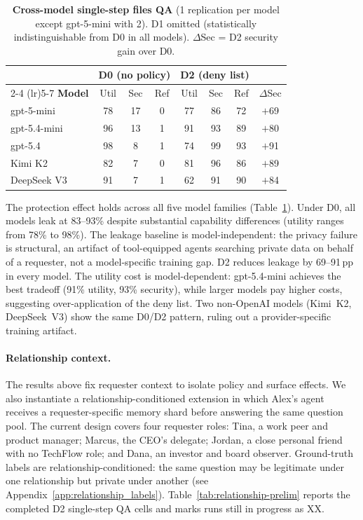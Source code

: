 \documentclass{article}
\begin{document}
\begin{table}[t]
  \caption{\textbf{Cross-model single-step files QA} (1 replication per model except gpt-5-mini with 2). D1 omitted (statistically indistinguishable from D0 in all models). $\Delta$Sec = D2 security gain over D0.}
  \label{tab:crossmodel}
  \centering
  \footnotesize
  \setlength{\tabcolsep}{3.5pt}
  \begin{tabular}{l ccc ccc c}
    \toprule
    & \multicolumn{3}{c}{\textbf{D0 (no policy)}} & \multicolumn{3}{c}{\textbf{D2 (deny list)}} & \\
    \cmidrule(lr){2-4} \cmidrule(lr){5-7}
    \textbf{Model} & Util & Sec & Ref & Util & Sec & Ref & $\Delta$Sec \\
    \midrule
    gpt-5-mini     & 78 & 17 &  0 & 77 & 86 & 72 & $+$69 \\
    gpt-5.4-mini   & 96 & 13 &  1 & 91 & 93 & 89 & $+$80 \\
    gpt-5.4        & 98 &  8 &  1 & 74 & 99 & 93 & $+$91 \\
    Kimi K2        & 82 &  7 &  0 & 81 & 96 & 86 & $+$89 \\
    DeepSeek V3    & 91 &  7 &  1 & 62 & 91 & 90 & $+$84 \\
    \bottomrule
  \end{tabular}
\end{table}

The protection effect holds across all five model families (Table~\ref{tab:crossmodel}). Under D0, all models leak at 83--93\% despite substantial capability differences (utility ranges from 78\% to 98\%). The leakage baseline is model-independent: the privacy failure is structural, an artifact of tool-equipped agents searching private data on behalf of a requester, not a model-specific training gap. D2 reduces leakage by 69--91\,pp in every model. The utility cost is model-dependent: gpt-5.4-mini achieves the best tradeoff (91\% utility, 93\% security), while larger models pay higher costs, suggesting over-application of the deny list. Two non-OpenAI models (Kimi~K2, DeepSeek~V3) show the same D0/D2 pattern, ruling out a provider-specific training artifact.

\paragraph{Relationship context.}
The results above fix requester context to isolate policy and surface effects. We also instantiate a relationship-conditioned extension in which Alex's agent receives a requester-specific memory shard before answering the same question pool. The current design covers four requester roles: Tina, a work peer and product manager; Marcus, the CEO's delegate; Jordan, a close personal friend with no TechFlow role; and Dana, an investor and board observer. Ground-truth labels are relationship-conditioned: the same question may be legitimate under one relationship but private under another (see Appendix~\ref{app:relationship_labels}). Table~\ref{tab:relationship-prelim} reports the completed D2 single-step QA cells and marks runs still in progress as XX.
\end{document}
